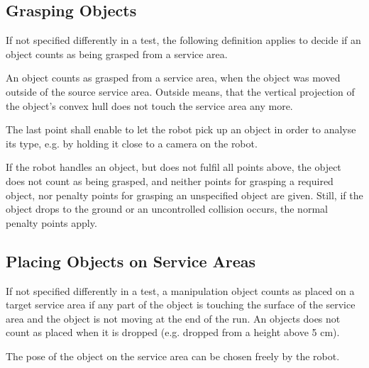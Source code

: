 \subsection{Grasping Objects} \label{ssec:GraspingObjects}
If not specified differently in a test, the following definition applies to decide if an object counts as being grasped from a service area.
\par
An object counts as grasped from a service area, when the object was moved outside of the source service area. Outside means, that the vertical projection of the object’s convex hull does not touch the service area any more.

\par
The last point shall enable to let the robot pick up an object in order to analyse its type, e.g. by holding it close to a camera on the robot.
\par
If the robot handles an object, but does not fulfil all points above, the object does not count as being grasped, and neither points for grasping a required object, nor penalty points for grasping an unspecified object are given. Still, if the object drops to the ground or an uncontrolled collision occurs, the normal penalty points apply.

\subsection{Placing Objects on Service Areas} \label{ssec:PlacingObjects}
If not specified differently in a test, a manipulation object counts as placed on a target service area if any part of the object is touching the surface of the service area and the object is not moving at the end of the run. An objects does not count as placed when it is dropped (e.g. dropped from a height above 5 cm). 
\par
The pose of the object on the service area can be chosen freely by the robot.


